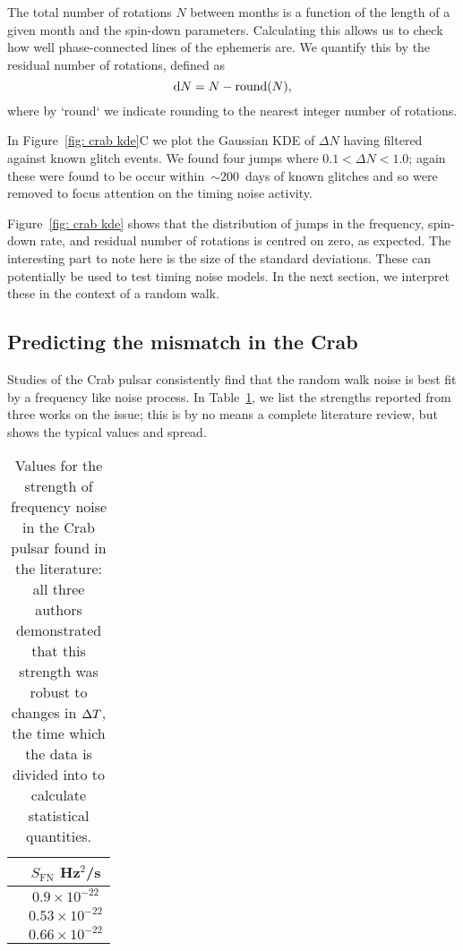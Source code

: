 \documentclass[../full_thesis/full_thesis.tex]{subfiles}
\begin{document}
The total number of rotations $N$ between months is a function of
the length of a given month and the spin-down parameters. Calculating this
allows us to check how well phase-connected lines of the ephemeris are.
We quantify this by the residual number of rotations, defined as
\begin{equation}
\mathrm{d} N = N - \textrm{round}(N),
\end{equation}
where by `round` we indicate rounding to the nearest integer number of rotations.

In Figure~\ref{fig: crab kde}C we plot the Gaussian KDE of $\Delta N$ having filtered
against known glitch events. We found four jumps where $0.1 < \Delta N < 1.0$;
again these were found to be occur within~$\sim200$~days of known glitches and
so were removed to focus attention on the timing noise activity.

Figure~\ref{fig: crab kde} shows that the distribution of jumps in the frequency,
spin-down rate, and residual number of rotations is centred on zero, as
expected. The interesting part to note here is the size of the standard deviations.
These can potentially be used to test timing noise models. In the next section,
we interpret these in the context of a random walk.

\subsection{Predicting the mismatch in the Crab}

Studies of the Crab pulsar consistently find that the random walk noise is
best fit by a frequency like noise process. In Table~\ref{tab: SFN lit}, we list
the strengths reported from three works on the issue; this is by no means a
complete literature review, but shows the typical values and spread.
\begin{table}[htb]
\centering
\begin{tabular}{c|c}
 & $S_{\textrm{FN}}$ Hz$^{2}$/s\\ \hline
\citet{Boynton1972} & $0.9\times10^{-22}$\\
\citet{Groth1975} & $ 0.53\times10^{-22}$\\
\citet{Cordes1980} & $0.66\times10^{-22}$
\end{tabular}
\caption{Values for the strength of frequency noise in the Crab pulsar found
         in the literature: all three authors demonstrated that this strength
         was robust to changes in $\Delta T$, the time which the data is divided into
         to calculate statistical quantities.}
\label{tab: SFN lit}
\end{table}
\end{document}
